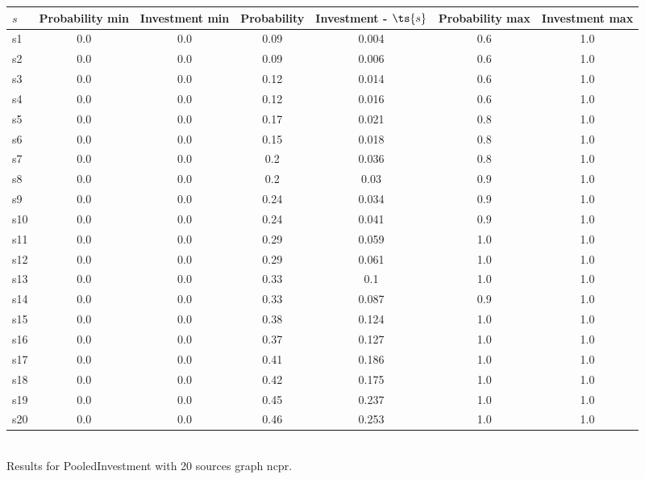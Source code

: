 \documentclass{article}
\begin{document}
\noindent\begin{tabular}{|l|c|c|c|c|c|c|}
\hline
$s$& Probability min & Investment min & Probability & Investment - $\ts{s}$ & Probability max & Investment max\\
\hline
s1 &0.0 & 0.0 & 0.09 & 0.004 & 0.6 & 1.0\\
\hline
s2 &0.0 & 0.0 & 0.09 & 0.006 & 0.6 & 1.0\\
\hline
s3 &0.0 & 0.0 & 0.12 & 0.014 & 0.6 & 1.0\\
\hline
s4 &0.0 & 0.0 & 0.12 & 0.016 & 0.6 & 1.0\\
\hline
s5 &0.0 & 0.0 & 0.17 & 0.021 & 0.8 & 1.0\\
\hline
s6 &0.0 & 0.0 & 0.15 & 0.018 & 0.8 & 1.0\\
\hline
s7 &0.0 & 0.0 & 0.2 & 0.036 & 0.8 & 1.0\\
\hline
s8 &0.0 & 0.0 & 0.2 & 0.03 & 0.9 & 1.0\\
\hline
s9 &0.0 & 0.0 & 0.24 & 0.034 & 0.9 & 1.0\\
\hline
s10 &0.0 & 0.0 & 0.24 & 0.041 & 0.9 & 1.0\\
\hline
s11 &0.0 & 0.0 & 0.29 & 0.059 & 1.0 & 1.0\\
\hline
s12 &0.0 & 0.0 & 0.29 & 0.061 & 1.0 & 1.0\\
\hline
s13 &0.0 & 0.0 & 0.33 & 0.1 & 1.0 & 1.0\\
\hline
s14 &0.0 & 0.0 & 0.33 & 0.087 & 0.9 & 1.0\\
\hline
s15 &0.0 & 0.0 & 0.38 & 0.124 & 1.0 & 1.0\\
\hline
s16 &0.0 & 0.0 & 0.37 & 0.127 & 1.0 & 1.0\\
\hline
s17 &0.0 & 0.0 & 0.41 & 0.186 & 1.0 & 1.0\\
\hline
s18 &0.0 & 0.0 & 0.42 & 0.175 & 1.0 & 1.0\\
\hline
s19 &0.0 & 0.0 & 0.45 & 0.237 & 1.0 & 1.0\\
\hline
s20 &0.0 & 0.0 & 0.46 & 0.253 & 1.0 & 1.0\\
\hline
\end{tabular}\\

\noindent Results for PooledInvestment with 20 sources graph ncpr.
\end{document}

